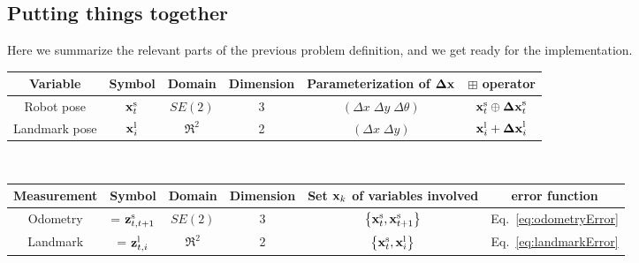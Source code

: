\documentclass[a4paper]{article}
\begin{document}
\subsection{Putting things together}
Here we summarize the relevant parts of the previous problem definition,
and we get ready for the implementation.\\[.3em]
{\small
\begin{tabular}{|c|c|c|c|c|c|}
\hline
\textbf{Variable} & \textbf{Symbol}  & \textbf{Domain} & \textbf{Dimension} & \textbf{Parameterization of }$\mathbf{\Delta x}$   & $\boxplus$ \textbf{operator} \\
\hline
Robot    pose     & $\mathbf{x}^\mathrm{s}_t$ & $SE(2)$         & 3                  & $(\Delta x \; \Delta y \; \Delta\theta)$  & $\mathbf{x}^\mathrm{s}_t \oplus \mathbf{\Delta x}^\mathrm{s}_t$ \\
\hline
Landmark pose     & $\mathbf{x}^\mathrm{l}_i$ & $\Re^2$         & 2                  & $(\Delta x \; \Delta y )$                 & $\mathbf{x}^\mathrm{l}_i + \mathbf{\Delta x}^\mathrm{l}_i$\\
\hline
\end{tabular}\\[.3em]
\begin{tabular}{|c|c|c|c|c|c|}
\hline
\textbf{Measurement} & \textbf{Symbol}         & \textbf{Domain} & \textbf{Dimension} & \textbf{Set $\mathbf{x}_k$ of variables involved}             & \textbf{error function}\\
\hline
Odometry             & = $\mathbf{z}^\mathrm{s}_{t,t+1}$ & $SE(2)$         & 3                  & $\left\{ \mathbf{x}^\mathrm{s}_t, \mathbf{x}^\mathrm{s}_{t+1} \right\}$ & Eq.~\ref{eq:odometryError} \\
\hline
Landmark             & = $\mathbf{z}^\mathrm{l}_{t,i}$   & $\Re^2$         & 2                  & $\left\{ \mathbf{x}^\mathrm{s}_t, \mathbf{x}^\mathrm{l}_{i} \right\}$  & Eq.~\ref{eq:landmarkError} \\
\hline
\end{tabular}}\\[.3em]
\end{document}
